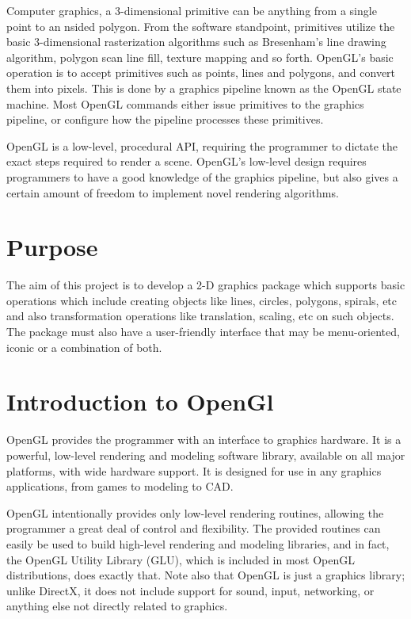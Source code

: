 \documentclass[12pt]{report}
\begin{document}
Computer graphics, a 3-dimensional primitive can be anything from a single point to an nsided polygon. From the software standpoint, primitives utilize the basic 3-dimensional rasterization algorithms such as Bresenham's line drawing algorithm, polygon scan line fill, texture mapping and so forth. OpenGL's basic operation is to accept primitives such as points, lines and polygons, and convert them into pixels. This is done by a graphics pipeline known as the OpenGL state machine. Most OpenGL commands either issue primitives to the graphics pipeline, or configure how the pipeline processes these primitives.



OpenGL is a low-level, procedural API, requiring the programmer to dictate the exact steps required to render a scene. OpenGL's low-level design requires programmers to have a good knowledge of the graphics pipeline, but also gives a certain amount of freedom to implement novel rendering algorithms.

\section{Purpose}


The aim of this project is to develop a 2-D graphics package which supports basic operations which include creating objects like lines, circles, polygons, spirals, etc and also transformation operations like translation, scaling, etc on such objects. The package must also have a user-friendly interface that may be menu-oriented, iconic or a combination of both.

\section{Introduction to OpenGl}
OpenGL provides the programmer with an interface to graphics hardware. It is a powerful, low-level rendering and modeling software library, available on all major platforms, with wide hardware support. It is designed for use in any graphics applications, from games to modeling to CAD.



OpenGL intentionally provides only low-level rendering routines, allowing the programmer a great deal of control and flexibility. The provided routines can easily be used to build high-level rendering and modeling libraries, and in fact, the OpenGL Utility Library (GLU), which is included in most OpenGL distributions, does exactly that. Note also that OpenGL is just a graphics library; unlike DirectX, it does not include support for sound, input, networking, or anything else not directly related to graphics.
\end{document}

